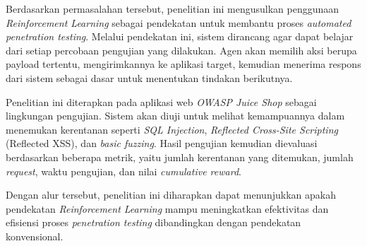 Berdasarkan permasalahan tersebut, penelitian ini mengusulkan penggunaan \textit{Reinforcement Learning} sebagai pendekatan untuk membantu proses \textit{automated penetration testing}. Melalui pendekatan ini, sistem dirancang agar dapat belajar dari setiap percobaan pengujian yang dilakukan. Agen akan memilih aksi berupa payload tertentu, mengirimkannya ke aplikasi target, kemudian menerima respons dari sistem sebagai dasar untuk menentukan tindakan berikutnya.

Penelitian ini diterapkan pada aplikasi web \textit{OWASP Juice Shop} sebagai lingkungan pengujian. Sistem akan diuji untuk melihat kemampuannya dalam menemukan kerentanan seperti \textit{SQL Injection}, \textit{Reflected Cross-Site Scripting} (Reflected XSS), dan \textit{basic fuzzing}. Hasil pengujian kemudian dievaluasi berdasarkan beberapa metrik, yaitu jumlah kerentanan yang ditemukan, jumlah \textit{request}, waktu pengujian, dan nilai \textit{cumulative reward}.

Dengan alur tersebut, penelitian ini diharapkan dapat menunjukkan apakah pendekatan \textit{Reinforcement Learning} mampu meningkatkan efektivitas dan efisiensi proses \textit{penetration testing} dibandingkan dengan pendekatan konvensional.
